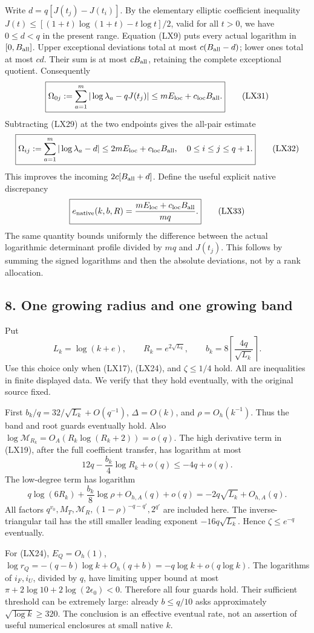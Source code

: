 \documentclass[10pt]{article}
\begin{document}
Write \(d=q[J(t_j)-J(t_i)]\). By the elementary elliptic coefficient inequality \(J(t)\le[(1+t)\log(1+t)-t\log t]/2\), valid for all \(t>0\), we have \(0\le d<q\) in the present range. Equation (LX9) puts every actual logarithm in \([0,B_{\rm all}]\). Upper exceptional deviations total at most \(c(B_{\rm all}-d)\); lower ones total at most \(cd\). Their sum is at most \(cB_{\rm all}\), retaining the complete exceptional quotient. Consequently \[
\boxed{\Omega_{0j}:=\sum_{a=1}^m|\log\lambda_a-qJ(t_j)|
\le mE_{\rm loc}+c_{\rm loc}B_{\rm all}.}
\tag{LX31}
\] Subtracting (LX29) at the two endpoints gives the all-pair estimate \[
\boxed{\Omega_{ij}:=\sum_{a=1}^m|\log\lambda_a-d|
\le2mE_{\rm loc}+c_{\rm loc}B_{\rm all},\quad0\le i\le j\le q+1.}
\tag{LX32}
\] This improves the incoming \(2c[B_{\rm all}+d]\). Define the useful explicit native discrepancy \[
\boxed{e_{\rm native}(k,b,R)=\frac{mE_{\rm loc}+c_{\rm loc}B_{\rm all}}{mq}.}
\tag{LX33}
\] The same quantity bounds uniformly the difference between the actual logarithmic determinant profile divided by \(mq\) and \(J(t_j)\). This follows by summing the signed logarithms and then the absolute deviations, not by a rank allocation.

\subsection{8. One growing radius and one growing band}\label{one-growing-radius-and-one-growing-band}

Put \[
L_k=\log(k+e),\qquad R_k=e^{2\sqrt{L_k}},\qquad
b_k=8\left\lceil\frac{4q}{\sqrt{L_k}}\right\rceil.
\tag{LX34}
\] Use this choice only when (LX17), (LX24), and \(\zeta\le1/4\) hold. All are inequalities in finite displayed data. We verify that they hold eventually, with the original source fixed.

First \(b_k/q=32/\sqrt{L_k}+O(q^{-1})\), \(\Delta=O(k)\), and \(\rho=O_h(k^{-1})\). Thus the band and root guards eventually hold. Also \(\log\mathcal M_{R_k}=O_A(R_k\log(R_k+2))=o(q)\). The high derivative term in (LX19), after the full coefficient transfer, has logarithm at most \[
12q-\frac{b_k}{4}\log R_k+o(q)\le-4q+o(q).
\] The low-degree term has logarithm \[
q\log(6R_k)+\frac{b_k}{8}\log\rho+O_{h,A}(q)+o(q)
=-2q\sqrt{L_k}+O_{h,A}(q).
\] All factors \(q^{v_0},M_T,\mathcal M_R,(1-\rho)^{-q-q'},2^{q'}\) are included here. The inverse-triangular tail has the still smaller leading exponent \(-16q\sqrt{L_k}\). Hence \(\zeta\le e^{-q}\) eventually.

For (LX24), \(E_Q=O_h(1)\), \(\log r_Q=-(q-b)\log k+O_h(q+b)= -q\log k+o(q\log k)\). The logarithms of \(i_F,i_U\), divided by \(q\), have limiting upper bound at most \(\pi+2\log10+2\log(2\epsilon_0)<0\). Therefore all four guards hold. Their sufficient threshold can be extremely large: already \(b\le q/10\) asks approximately \(\sqrt{\log k}\ge320\). The conclusion is an effective eventual rate, not an assertion of useful numerical enclosures at small native \(k\).
\end{document}
